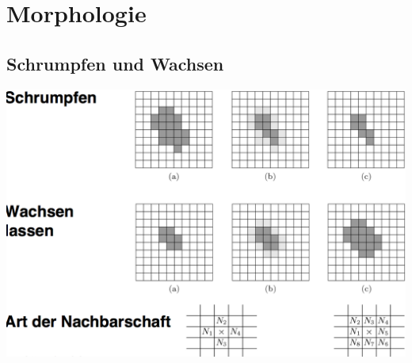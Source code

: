 \documentclass[10pt]{article}
\begin{document}
\pagebreak
\section{Morphologie}

\subsection{Schrumpfen und Wachsen}
\begin{center}
	\includegraphics[scale=0.25]{schrumpfen-und-wachsen.png}
\end{center}
\end{document}
